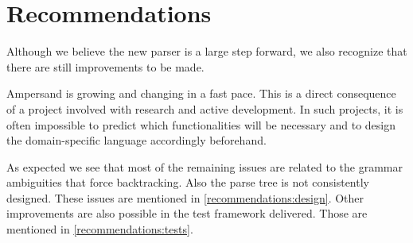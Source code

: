 
\section{Recommendations}
\label{sec:recommendations}
Although we believe the new parser is a large step forward, we also recognize that there are still improvements to be made.

Ampersand is growing and changing in a fast pace.
This is a direct consequence of a project involved with research and active development.
In such projects, it is often impossible to predict which functionalities will be necessary and to design the domain-specific language accordingly beforehand.

As expected we see that most of the remaining issues are related to the grammar ambiguities that force backtracking.
Also the parse tree is not consistently designed.
These issues are mentioned in \autoref{recommendations:design}.
Other improvements are also possible in the test framework delivered.
Those are mentioned in \autoref{recommendations:tests}.





